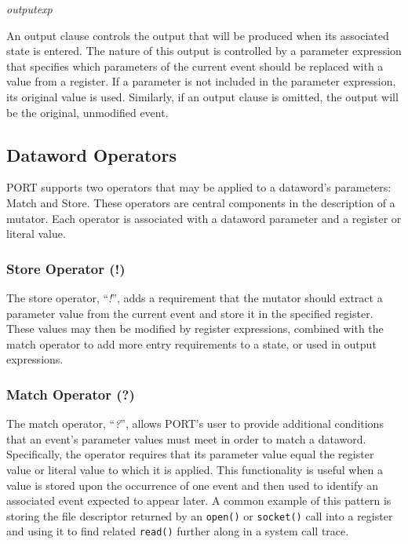 \textit{outputexp}

An output clause controls the output that will be produced when its
associated state is entered.  The nature of this output is controlled by a
parameter expression that specifies which parameters of the current event
should be replaced with a value from a register.  If a parameter is not
included in the parameter expression, its original value is used.
Similarly,
if an output clause is omitted, the output will be the
original, unmodified event.

\subsection{Dataword Operators}
\label{sub:DatawordOperators}

PORT supports two operators that may be applied to a dataword's
parameters: Match and Store.  These operators are central components in
the description of a mutator.  Each operator is associated with a dataword
parameter and a register or literal value.

\subsubsection{Store Operator (!)}

The store operator, ``\textit{!}'', adds a requirement that the
mutator should extract a parameter value from the current event and store
it in the specified register.  These values may then be modified by
register expressions, combined with the match operator to add more
entry requirements to a state, or used in output expressions.

\subsubsection{Match Operator (?)}

The match operator, ``\textit{?}'',
allows PORT's user
to provide additional conditions
that an event's parameter values must meet
in order to match a dataword.
Specifically,
the operator requires
that its parameter value equal the
register value
or literal value
to which it is applied.
This functionality is
useful when a value is stored upon the occurrence of one event
and then used to identify an associated event expected to appear later.
A common example of this pattern is storing the file descriptor
returned by an {\tt open()} or {\tt socket()} call into a register
and using it to find related {\tt read()} further along in a system call
trace.

